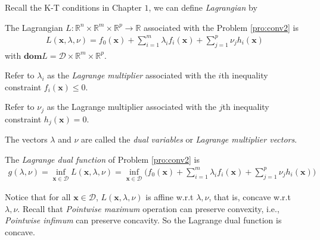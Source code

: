 Recall the K-T conditions in Chapter $1$, we can define
\emph{Lagrangian} by
\begin{definition}[Lagrangian]
    The Lagrangian $L: \mathbb{R}^n \times \mathbb{R}^m
    \times \mathbb{R}^p \rightarrow \mathbb{R}$
    associated with the Problem \ref{pro:conv2} is
    \begin{align}
        L(\mathbf{x}, \lambda, \nu) = 
        f_0(\mathbf{x}) +
        \sum_{i=1}^m \lambda_i f_i(\mathbf{x}) +
        \sum_{j=1}^p \nu_j h_i(\mathbf{x})
    \end{align}
    with $\mathbf{dom}L = \mathcal{D} \times \mathbb{R}^m
    \times \mathbb{R}^p$.
\end{definition}
\par
Refer to $\lambda_i$ as the \emph{Lagrange multiplier}
associated with the $i$th inequality constraint
$f_i(\mathbf{x}) \leq 0$.
\par
Refer to $\nu_j$ as the Lagrange multiplier
associated with the $j$th inequality constraint
$h_j(\mathbf{x}) = 0$.
\par
The vectors $\lambda$ and $\nu$ are called the
\emph{dual variables} or \emph{Lagrange multiplier vectors}.
\begin{definition}
    The \emph{Lagrange dual function} of Problem
    \ref{pro:conv2} is
    \begin{align}
        g(\lambda, \nu) = \inf_{\mathbf{x} \in \mathcal{D}}
        L(\mathbf{x}, \lambda, \nu) = 
        \inf_{\mathbf{x} \in \mathcal{D}}
        \Big( f_0(\mathbf{x}) +
        \sum_{i=1}^m \lambda_i f_i(\mathbf{x}) +
        \sum_{j=1}^p \nu_j h_i(\mathbf{x}) \Big)
        \label{equ:lagrange1}
    \end{align}
\end{definition}

Notice that for all $\mathbf{x} \in \mathcal{D}$,
$L(\mathbf{x}, \lambda, \nu)$ is affine w.r.t
$\lambda, \nu$, that is, concave w.r.t $\lambda, \nu$.
Recall that \emph{Pointwise maximum} operation can
preserve convexity, i.e., \emph{Pointwise infimum}
can preserve concavity.
So the Lagrange dual function is concave.
